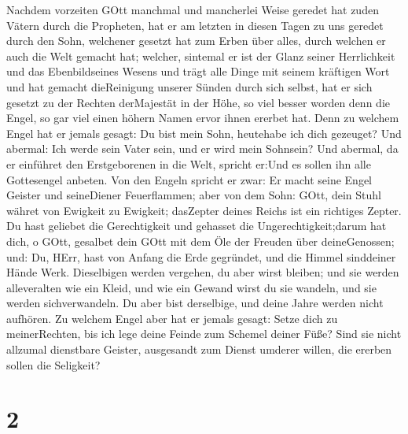  Nachdem vorzeiten GOtt manchmal und mancherlei Weise
geredet hat zuden Vätern durch die Propheten,  hat er am
letzten in diesen Tagen zu uns geredet durch den Sohn, welchener gesetzt
hat zum Erben über alles, durch welchen er auch die Welt gemacht hat;
 welcher, sintemal er ist der Glanz seiner Herrlichkeit und
das Ebenbildseines Wesens und trägt alle Dinge mit seinem kräftigen Wort
und hat gemacht dieReinigung unserer Sünden durch sich selbst, hat er
sich gesetzt zu der Rechten derMajestät in der Höhe,  so
viel besser worden denn die Engel, so gar viel einen höhern Namen ervor
ihnen ererbet hat.  Denn zu welchem Engel hat er jemals
gesagt: Du bist mein Sohn, heutehabe ich dich gezeuget? Und abermal: Ich
werde sein Vater sein, und er wird mein Sohnsein?  Und
abermal, da er einführet den Erstgeborenen in die Welt, spricht er:Und
es sollen ihn alle Gottesengel anbeten.  Von den Engeln
spricht er zwar: Er macht seine Engel Geister und seineDiener
Feuerflammen;  aber von dem Sohn: GOtt, dein Stuhl währet
von Ewigkeit zu Ewigkeit; dasZepter deines Reichs ist ein richtiges
Zepter.  Du hast geliebet die Gerechtigkeit und gehasset die
Ungerechtigkeit;darum hat dich, o GOtt, gesalbet dein GOtt mit dem Öle
der Freuden über deineGenossen;  und: Du, HErr, hast von
Anfang die Erde gegründet, und die Himmel sinddeiner Hände Werk.
 Dieselbigen werden vergehen, du aber wirst bleiben; und
sie werden alleveralten wie ein Kleid,  und wie ein Gewand
wirst du sie wandeln, und sie werden sichverwandeln. Du aber bist
derselbige, und deine Jahre werden nicht aufhören.  Zu
welchem Engel aber hat er jemals gesagt: Setze dich zu meinerRechten,
bis ich lege deine Feinde zum Schemel deiner Füße?  Sind
sie nicht allzumal dienstbare Geister, ausgesandt zum Dienst umderer
willen, die ererben sollen die Seligkeit?

\hypertarget{section}{%
\section{2}\label{section}}

